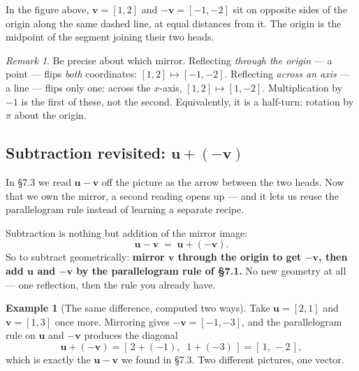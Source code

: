 \documentclass[11pt]{article}
\theoremstyle{definition}
\newtheorem{ex}{Example}[section]
\theoremstyle{remark}
\newtheorem*{rmk}{Remark}
\newcommand{\vc}[1]{\mathbf{#1}}
\newcommand{\lattice}[4]{%
  \draw[step=1cm,gray!25,very thin] (#1,#3) grid (#2,#4);
  \draw[axisline] (#1,0) -- (#2+0.45,0) node[right,font=\scriptsize,black]{$x$};
  \draw[axisline] (0,#3) -- (0,#4+0.45) node[above,font=\scriptsize,black]{$y$};
}
\begin{document}
\noindent In the figure above, $\vc{v}=[1,2]$ and $-\vc{v}=[-1,-2]$ sit on
opposite sides of the origin along the same dashed line, at equal distances from
it. The origin is the midpoint of the segment joining their two heads.

\begin{rmk}
Be precise about which mirror. Reflecting \emph{through the origin} --- a point
--- flips \emph{both} coordinates: $[1,2]\mapsto[-1,-2]$. Reflecting
\emph{across an axis} --- a line --- flips only one: across the $x$-axis,
$[1,2]\mapsto[1,-2]$. Multiplication by $-1$ is the first of these, not the
second. Equivalently, it is a half-turn: rotation by $\pi$ about the origin.
\end{rmk}

\subsection{Subtraction revisited: \texorpdfstring{$\vc{u}+(-\vc{v})$}{u + (-v)}}
In \S7.3 we read $\vc{u}-\vc{v}$ off the picture as the arrow between the two
heads. Now that we own the mirror, a second reading opens up --- and it lets us
reuse the parallelogram rule instead of learning a separate recipe.

Subtraction is nothing but addition of the mirror image:
\[
  \vc{u}-\vc{v} \;=\; \vc{u}+(-\vc{v}).
\]
So to subtract geometrically: \textbf{mirror $\vc{v}$ through the origin to get
$-\vc{v}$, then add $\vc{u}$ and $-\vc{v}$ by the parallelogram rule of \S7.1.}
No new geometry at all --- one reflection, then the rule you already have.

\begin{ex}[The same difference, computed two ways]
Take $\vc{u}=[2,1]$ and $\vc{v}=[1,3]$ once more. Mirroring gives
$-\vc{v}=[-1,-3]$, and the parallelogram rule on $\vc{u}$ and $-\vc{v}$ produces
the diagonal
\[
  \vc{u}+(-\vc{v})=[\,2+(-1),\;\;1+(-3)\,]=[\,1,\,-2\,],
\]
which is exactly the $\vc{u}-\vc{v}$ we found in \S7.3. Two different pictures,
one vector.
\end{ex}

\begin{center}
\end{center}
\end{document}
